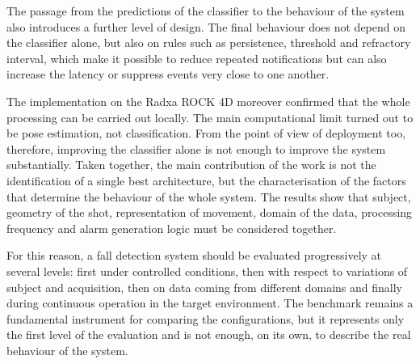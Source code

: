 The passage from the predictions of the classifier to the behaviour of the system also introduces a further level of design. The final behaviour does not depend on the classifier alone, but also on rules such as persistence, threshold and refractory interval, which make it possible to reduce repeated notifications but can also increase the latency or suppress events very close to one another.

The implementation on the Radxa ROCK 4D moreover confirmed that the whole processing can be carried out locally. The main computational limit turned out to be pose estimation, not classification. From the point of view of deployment too, therefore, improving the classifier alone is not enough to improve the system substantially. Taken together, the main contribution of the work is not the identification of a single best architecture, but the characterisation of the factors that determine the behaviour of the whole system. The results show that subject, geometry of the shot, representation of movement, domain of the data, processing frequency and alarm generation logic must be considered together.

For this reason, a fall detection system should be evaluated progressively at several levels: first under controlled conditions, then with respect to variations of subject and acquisition, then on data coming from different domains and finally during continuous operation in the target environment. The benchmark remains a fundamental instrument for comparing the configurations, but it represents only the first level of the evaluation and is not enough, on its own, to describe the real behaviour of the system.
